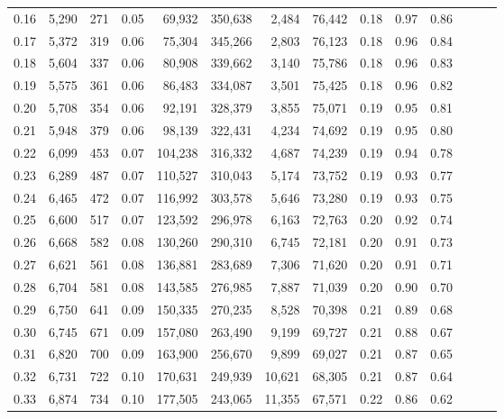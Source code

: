 \begin{tabular}{rrrrrrrrrrrrrr}
0.16 &   5,290 &    271 &  0.05 &   69,932 &  350,638 &   2,484 &  76,442 &  0.18 &  0.97 &      0.86 \\
0.17 &   5,372 &    319 &  0.06 &   75,304 &  345,266 &   2,803 &  76,123 &  0.18 &  0.96 &      0.84 \\
0.18 &   5,604 &    337 &  0.06 &   80,908 &  339,662 &   3,140 &  75,786 &  0.18 &  0.96 &      0.83 \\
0.19 &   5,575 &    361 &  0.06 &   86,483 &  334,087 &   3,501 &  75,425 &  0.18 &  0.96 &      0.82 \\
0.20 &   5,708 &    354 &  0.06 &   92,191 &  328,379 &   3,855 &  75,071 &  0.19 &  0.95 &      0.81 \\
0.21 &   5,948 &    379 &  0.06 &   98,139 &  322,431 &   4,234 &  74,692 &  0.19 &  0.95 &      0.80 \\
0.22 &   6,099 &    453 &  0.07 &  104,238 &  316,332 &   4,687 &  74,239 &  0.19 &  0.94 &      0.78 \\
0.23 &   6,289 &    487 &  0.07 &  110,527 &  310,043 &   5,174 &  73,752 &  0.19 &  0.93 &      0.77 \\
0.24 &   6,465 &    472 &  0.07 &  116,992 &  303,578 &   5,646 &  73,280 &  0.19 &  0.93 &      0.75 \\
0.25 &   6,600 &    517 &  0.07 &  123,592 &  296,978 &   6,163 &  72,763 &  0.20 &  0.92 &      0.74 \\
0.26 &   6,668 &    582 &  0.08 &  130,260 &  290,310 &   6,745 &  72,181 &  0.20 &  0.91 &      0.73 \\
0.27 &   6,621 &    561 &  0.08 &  136,881 &  283,689 &   7,306 &  71,620 &  0.20 &  0.91 &      0.71 \\
0.28 &   6,704 &    581 &  0.08 &  143,585 &  276,985 &   7,887 &  71,039 &  0.20 &  0.90 &      0.70 \\
0.29 &   6,750 &    641 &  0.09 &  150,335 &  270,235 &   8,528 &  70,398 &  0.21 &  0.89 &      0.68 \\
0.30 &   6,745 &    671 &  0.09 &  157,080 &  263,490 &   9,199 &  69,727 &  0.21 &  0.88 &      0.67 \\
0.31 &   6,820 &    700 &  0.09 &  163,900 &  256,670 &   9,899 &  69,027 &  0.21 &  0.87 &      0.65 \\
0.32 &   6,731 &    722 &  0.10 &  170,631 &  249,939 &  10,621 &  68,305 &  0.21 &  0.87 &      0.64 \\
0.33 &   6,874 &    734 &  0.10 &  177,505 &  243,065 &  11,355 &  67,571 &  0.22 &  0.86 &      0.62 \\

\end{tabular}
